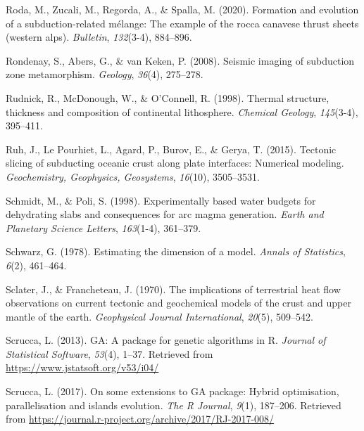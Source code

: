 \begin{CSLReferences}{1}{1}
\leavevmode{}%
Roda, M., Zucali, M., Regorda, A., \& Spalla, M. (2020). Formation and evolution of a subduction-related m{é}lange: The example of the rocca canavese thrust sheets (western alps). \emph{Bulletin}, \emph{132}(3-4), 884--896.

\leavevmode{}%
Rondenay, S., Abers, G., \& van Keken, P. (2008). Seismic imaging of subduction zone metamorphism. \emph{Geology}, \emph{36}(4), 275--278.

\leavevmode{}%
Rudnick, R., McDonough, W., \& O'Connell, R. (1998). Thermal structure, thickness and composition of continental lithosphere. \emph{Chemical Geology}, \emph{145}(3-4), 395--411.

\leavevmode{}%
Ruh, J., Le Pourhiet, L., Agard, P., Burov, E., \& Gerya, T. (2015). Tectonic slicing of subducting oceanic crust along plate interfaces: Numerical modeling. \emph{Geochemistry, Geophysics, Geosystems}, \emph{16}(10), 3505--3531.

\leavevmode{}%
Schmidt, M., \& Poli, S. (1998). Experimentally based water budgets for dehydrating slabs and consequences for arc magma generation. \emph{Earth and Planetary Science Letters}, \emph{163}(1-4), 361--379.

\leavevmode{}%
Schwarz, G. (1978). Estimating the dimension of a model. \emph{Annals of Statistics}, \emph{6}(2), 461--464.

\leavevmode{}%
Sclater, J., \& Francheteau, J. (1970). The implications of terrestrial heat flow observations on current tectonic and geochemical models of the crust and upper mantle of the earth. \emph{Geophysical Journal International}, \emph{20}(5), 509--542.

\leavevmode{}%
Scrucca, L. (2013). {GA}: A package for genetic algorithms in {R}. \emph{Journal of Statistical Software}, \emph{53}(4), 1--37. Retrieved from \url{https://www.jstatsoft.org/v53/i04/}

\leavevmode{}%
Scrucca, L. (2017). On some extensions to {GA} package: Hybrid optimisation, parallelisation and islands evolution. \emph{The R Journal}, \emph{9}(1), 187--206. Retrieved from \url{https://journal.r-project.org/archive/2017/RJ-2017-008/}


\end{CSLReferences}
